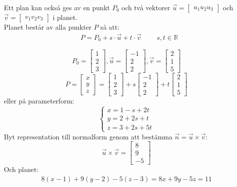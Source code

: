 \newpage
\noindent
Ett plan kan också ges av en punkt $P_0$ och två vektorer $\vec{u} = \begin{bmatrix} u_1u_2u_3 \end{bmatrix}$ och $\vec{v} = \begin{bmatrix} v_1v_2v_3 \end{bmatrix}$ i planet.\\
Planet består av alla punkter $P$ så att:
\begin{align*}
&P = P_0 + s \cdot \vec{u} + t \cdot \vec{v}\mbox{  } &&s,t \in \mathbb{R}
\end{align*}
\begin{Ex}
    \[
        P_0 = \begin{bmatrix} 1\\2\\3 \end{bmatrix}, \vec{u} = \begin{bmatrix} -1\\2\\2 \end{bmatrix}, \vec{v} = \begin{bmatrix} 2\\1\\5 \end{bmatrix}
    \]
    \[
        P = \begin{bmatrix} x\\y\\z \end{bmatrix} = \begin{bmatrix} 1\\2\\3 \end{bmatrix} + s \begin{bmatrix} -1\\2\\2 \end{bmatrix} + t \begin{bmatrix} 2\\1\\5 \end{bmatrix}
    \]
    eller på parameterform:
    \[
        \begin{cases}
            x = 1-s + 2t \\
            y = 2+2s +t \\
            z = 3+2s +5t
        \end{cases}
    \]
    Byt representation till normalform genom att bestämma $\vec{n} = \vec{u} \times \vec{v}$:
    \[
        \vec{u} \times \vec{v} = \begin{bmatrix} 8\\9\\-5 \end{bmatrix} 
    \]
    Och planet:
    \begin{align*}
    8(x-1) + 9(y-2) - 5(z-3) = 8x + 9y - 5z = 11
    \end{align*}
\end{Ex}
